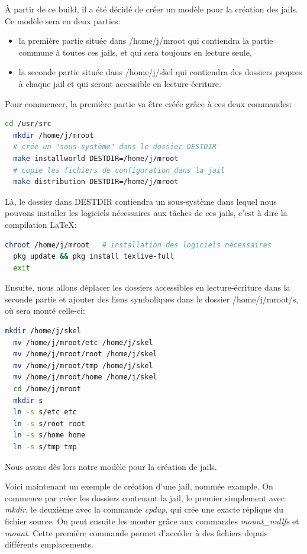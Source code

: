 \documentclass[10pt,a4paper]{article}
\begin{document}
À partir de ce build, il a été décidé de créer un modèle pour la création des jails.
Ce modèle sera en deux parties:
\begin{itemize}
  \item la première partie située dans /home/j/mroot qui contiendra la partie commune à toutes ces jails, et qui sera toujours en lecture seule,
  \item la seconde partie située dans /home/j/skel qui contiendra des dossiers propres à chaque jail et qui seront accessible en lecture-écriture.
\end{itemize}
Pour commencer, la première partie va être créée grâce à ces deux commandes:
\begin{lstlisting}[language=bash]
  cd /usr/src
  mkdir /home/j/mroot
  # crée un "sous-système" dans le dossier DESTDIR
  make installworld DESTDIR=/home/j/mroot
  # copie les fichiers de configuration dans la jail
  make distribution DESTDIR=/home/j/mroot
\end{lstlisting}
Là, le dossier dans DESTDIR contiendra un sous-système dans lequel nous pouvons installer les logiciels nécessaires aux tâches de ces jails, c'est à dire la compilation \LaTeX:
\begin{lstlisting}[language=bash]
  chroot /home/j/mroot   # installation des logiciels nécessaires
  pkg update && pkg install texlive-full
  exit
\end{lstlisting}
Ensuite, nous allons déplacer les dossiers accessibles en lecture-écriture dans la seconde partie et ajouter des liens symboliques dans le dossier /home/j/mroot/s, où sera monté celle-ci:
\begin{lstlisting}[language=bash]
  mkdir /home/j/skel
  mv /home/j/mroot/etc /home/j/skel
  mv /home/j/mroot/root /home/j/skel
  mv /home/j/mroot/tmp /home/j/skel
  mv /home/j/mroot/home /home/j/skel
  cd /home/j/mroot
  mkdir s
  ln -s s/etc etc
  ln -s s/root root
  ln -s s/home home
  ln -s s/tmp tmp
\end{lstlisting}
Nous avons dès lors notre modèle pour la création de jails.

Voici maintenant un exemple de création d'une jail, nommée example.
On commence par créer les dossiers contenant la jail, le premier simplement avec \emph{mkdir},
le deuxième avec la commande \emph{cpdup}, qui crée une exacte réplique du fichier source.
On peut ensuite les monter grâce aux commandes \emph{mount\_nullfs} et \emph{mount}.
Cette première commande permet d'accéder à des fichiers depuis différents emplacements.
\end{document}
